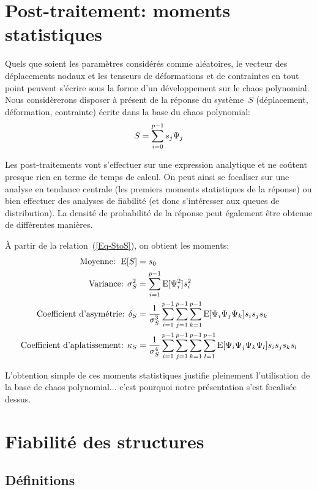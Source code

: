 \medskip
\section{Post-traitement: moments statistiques}

Quels que soient les paramètres considérés comme aléatoires, le vecteur des déplacements nodaux et les tenseurs de déformations et de contraintes en tout point peuvent s'écrire sous la forme d'un développement sur le chaos polynomial. 
Nous considèrerons disposer à présent de la réponse du système~$S$ (déplacement, déformation, contrainte) écrite dans la base du chaos polynomial:
\begin{equation}\label{Eq-StoS}
S=\displaystyle\sum_{i=0}^{p-1}s_j\Psi_j
\end{equation}

Les post-traitements vont s'effectuer sur une expression analytique et ne coûtent presque rien en terme de temps de calcul. On peut ainsi se focaliser sur une analyse en tendance centrale (les premiers moments statistiques de la réponse) ou bien effectuer des analyses de fiabilité (et donc s'intéresser aux queues de distribution). La densité de probabilité de la réponse peut également être obtenue de différentes manières.

\medskip
À partir de la relation~(\ref{Eq-StoS}), on obtient les moments:
\begin{align}
\text{Moyenne: } \operatorname{E}[S] &=s_0\\
\text{Variance: } \sigma^2_S &=\displaystyle\sum_{i=1}^{p-1}\operatorname{E}[\Psi_i^2]s_i^2\\
\text{Coefficient d'asymétrie: } \delta_S &=\dfrac1{\sigma^3_S}\displaystyle\sum_{i=1}^{p-1}\displaystyle\sum_{j=1}^{p-1}\displaystyle\sum_{k=1}^{p-1}\operatorname{E}[\Psi_i\Psi_j\Psi_k]s_is_js_k\\
\text{Coefficient d'aplatissement: } \kappa_S &=\dfrac1{\sigma^4_S}\displaystyle\sum_{i=1}^{p-1}\displaystyle\sum_{j=1}^{p-1}\displaystyle\sum_{k=1}^{p-1}\displaystyle\sum_{l=1}^{p-1}\operatorname{E}[\Psi_i\Psi_j\Psi_k\Psi_l]s_is_js_ks_l
\end{align}

\medskip
L'obtention simple de ces moments statistiques justifie pleinement l'utilisation de la base de chaos polynomial... c'est pourquoi notre présentation s'est focalisée dessus.


\medskip
\section{Fiabilité des structures}

\subsection{Définitions}

